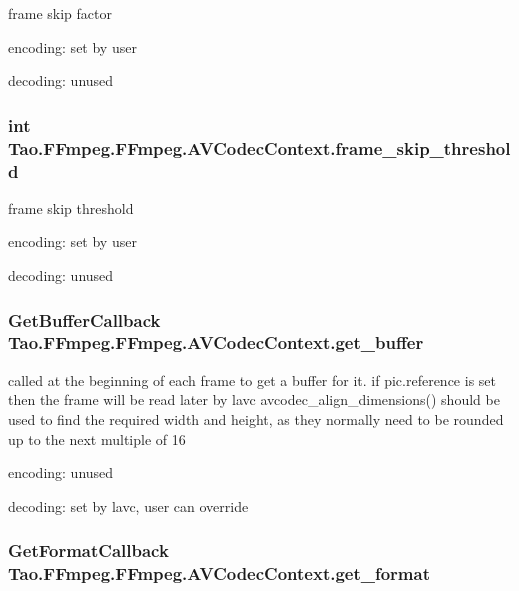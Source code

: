 \label{struct_tao_1_1_f_fmpeg_1_1_f_fmpeg_1_1_a_v_codec_context_a0368864715fb8b34f45b1f3f41c3cded}
frame skip factor
\begin{DoxyItemize}
\item encoding: set by user
\item decoding: unused 
\end{DoxyItemize}\hypertarget{struct_tao_1_1_f_fmpeg_1_1_f_fmpeg_1_1_a_v_codec_context_a5eb92b636e755c75e9c7cf80113505af}{
\subsubsection[{frame\_\-skip\_\-threshold}]{\setlength{\rightskip}{0pt plus 5cm}int {\bf Tao.FFmpeg.FFmpeg.AVCodecContext.frame\_\-skip\_\-threshold}}}
\label{struct_tao_1_1_f_fmpeg_1_1_f_fmpeg_1_1_a_v_codec_context_a5eb92b636e755c75e9c7cf80113505af}
frame skip threshold
\begin{DoxyItemize}
\item encoding: set by user
\item decoding: unused 
\end{DoxyItemize}\hypertarget{struct_tao_1_1_f_fmpeg_1_1_f_fmpeg_1_1_a_v_codec_context_a48cbd8569687391bccaedb762db94404}{
\subsubsection[{get\_\-buffer}]{\setlength{\rightskip}{0pt plus 5cm}GetBufferCallback {\bf Tao.FFmpeg.FFmpeg.AVCodecContext.get\_\-buffer}}}
\label{struct_tao_1_1_f_fmpeg_1_1_f_fmpeg_1_1_a_v_codec_context_a48cbd8569687391bccaedb762db94404}
called at the beginning of each frame to get a buffer for it. if pic.reference is set then the frame will be read later by lavc avcodec\_\-align\_\-dimensions() should be used to find the required width and height, as they normally need to be rounded up to the next multiple of 16
\begin{DoxyItemize}
\item encoding: unused
\item decoding: set by lavc, user can override 
\end{DoxyItemize}\hypertarget{struct_tao_1_1_f_fmpeg_1_1_f_fmpeg_1_1_a_v_codec_context_aa1e2ce4aee944643c21c6d9ebd11737c}{
\subsubsection[{get\_\-format}]{\setlength{\rightskip}{0pt plus 5cm}GetFormatCallback {\bf Tao.FFmpeg.FFmpeg.AVCodecContext.get\_\-format}}}
